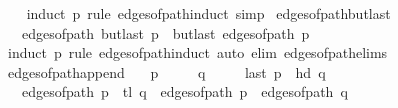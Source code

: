 \begin{isabellebody}
\isanewline
%
\endisadeliminvisible
%
\isadelimproof
\ \ %
\endisadelimproof
%
\isatagproof
{}\isamarkupfalse%
\ {\isacharparenleft}{\kern0pt}induct\ p\ rule{\isacharcolon}{\kern0pt}\ edges{\isacharunderscore}{\kern0pt}of{\isacharunderscore}{\kern0pt}path{\isachardot}{\kern0pt}induct{\isacharparenright}{\kern0pt}\ simp{\isacharplus}{\kern0pt}%
\endisatagproof
{\isafoldproof}%
%
\isadelimproof
\isanewline
%
\endisadelimproof
%
\isadeliminvisible
\isanewline
%
\endisadeliminvisible
%
\isataginvisible
{}\isamarkupfalse%
\ edges{\isacharunderscore}{\kern0pt}of{\isacharunderscore}{\kern0pt}path{\isacharunderscore}{\kern0pt}butlast{\isacharcolon}{\kern0pt}\isanewline
\ \ \ {\isachardoublequoteopen}edges{\isacharunderscore}{\kern0pt}of{\isacharunderscore}{\kern0pt}path\ {\isacharparenleft}{\kern0pt}butlast\ p{\isacharparenright}{\kern0pt}\ {\isacharequal}{\kern0pt}\ butlast\ {\isacharparenleft}{\kern0pt}edges{\isacharunderscore}{\kern0pt}of{\isacharunderscore}{\kern0pt}path\ p{\isacharparenright}{\kern0pt}{\isachardoublequoteclose}%
\endisataginvisible
{\isafoldinvisible}%
%
\isadeliminvisible
\isanewline
%
\endisadeliminvisible
%
\isadelimproof
\ \ %
\endisadelimproof
%
\isatagproof
{}\isamarkupfalse%
\ {\isacharparenleft}{\kern0pt}induct\ p\ rule{\isacharcolon}{\kern0pt}\ edges{\isacharunderscore}{\kern0pt}of{\isacharunderscore}{\kern0pt}path{\isachardot}{\kern0pt}induct{\isacharparenright}{\kern0pt}\ {\isacharparenleft}{\kern0pt}auto\ elim{\isacharcolon}{\kern0pt}\ edges{\isacharunderscore}{\kern0pt}of{\isacharunderscore}{\kern0pt}path{\isachardot}{\kern0pt}elims{\isacharparenright}{\kern0pt}%
\endisatagproof
{\isafoldproof}%
%
\isadelimproof
\isanewline
%
\endisadelimproof
%
\isadeliminvisible
\isanewline
%
\endisadeliminvisible
%
\isataginvisible
{}\isamarkupfalse%
\ edges{\isacharunderscore}{\kern0pt}of{\isacharunderscore}{\kern0pt}path{\isacharunderscore}{\kern0pt}append{\isacharunderscore}{\kern0pt}{}{\isacharcolon}{\kern0pt}\isanewline
\ \ \ {\isachardoublequoteopen}p\ {\isasymnoteq}\ {\isacharbrackleft}{\kern0pt}{\isacharbrackright}{\kern0pt}{\isachardoublequoteclose}\isanewline
\ \ \ {\isachardoublequoteopen}q\ {\isasymnoteq}\ {\isacharbrackleft}{\kern0pt}{\isacharbrackright}{\kern0pt}{\isachardoublequoteclose}\isanewline
\ \ \ {\isachardoublequoteopen}last\ p\ {\isacharequal}{\kern0pt}\ hd\ q{\isachardoublequoteclose}\isanewline
\ \ \ {\isachardoublequoteopen}edges{\isacharunderscore}{\kern0pt}of{\isacharunderscore}{\kern0pt}path\ {\isacharparenleft}{\kern0pt}p\ {\isacharat}{\kern0pt}\ tl\ q{\isacharparenright}{\kern0pt}\ {\isacharequal}{\kern0pt}\ edges{\isacharunderscore}{\kern0pt}of{\isacharunderscore}{\kern0pt}path\ p\ {\isacharat}{\kern0pt}\ edges{\isacharunderscore}{\kern0pt}of{\isacharunderscore}{\kern0pt}path\ q{\isachardoublequoteclose}%

\end{isabellebody}
